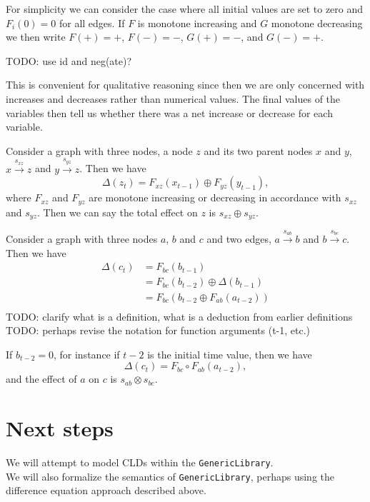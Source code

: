 \documentclass[a4paper,11pt]{article}
\begin{document}
For simplicity we can consider the case where all initial values are
set to zero and $F_i(0)=0$ for all edges.
%
If $F$ is monotone increasing and $G$ monotone decreasing we then
write $F(+) = +$, $F(-) = -$, $G(+)=-$, and $G(-)=+$.

TODO: use id and neg(ate)?

This is convenient for qualitative reasoning since then we are only
concerned with increases and decreases rather than numerical values.
%
The final values of the variables then tell us whether there was a net
increase or decrease for each variable.

Consider a graph with three nodes, a node $z$ and its two parent nodes
$x$ and $y$, $x\xrightarrow{s_{xz}} z$ and $y\xrightarrow{s_{yz}} z$.
%
Then we have
\[\Delta(z_t) = F_{xz}(x_{t-1}) \oplus F_{yz}(y_{t-1}),\]
where $F_{xz}$ and $F_{yz}$ are monotone increasing or decreasing in
accordance with $s_{xz}$ and $s_{yz}$.
%
Then we can say the total effect on $z$ is $s_{xz}\oplus s_{yz}$.

Consider a graph with three nodes $a$, $b$ and $c$ and two edges,
$a\xrightarrow{s_{ab}} b$ and $b\xrightarrow{s_{bc}} c$. Then we have
\begin{align*}
\Delta(c_t) &= F_{bc}(b_{t-1})\\
&= F_{bc}(b_{t-2}) \oplus \Delta(b_{t-1})\\
&= F_{bc}(b_{t-2}  \oplus F_{ab}(a_{t-2}))\\
\end{align*}
TODO: clarify what is a definition, what is a deduction from earlier definitions
TODO: perhaps revise the notation for function arguments (t-1, etc.)

If $b_{t-2} = 0$, for instance if $t-2$ is the initial time value,
then we have
\[\Delta(c_t) = F_{bc}\circ F_{ab}(a_{t-2}),\]
and the effect of $a$ on $c$ is $s_{ab}\otimes s_{bc}$.

\section{Next steps}
We will attempt to model CLDs within the \verb|GenericLibrary|.\\

We will also formalize the semantics of \verb|GenericLibrary|, perhaps
using the difference equation approach described above.
\end{document}
